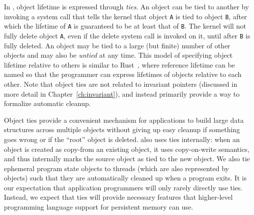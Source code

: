 In \Twizzler, object lifetime is expressed through \emph{ties}.
An object can be tied to another by invoking a system call that tells the kernel that
object \texttt{A} is tied to object \texttt{B}, after which the lifetime of \texttt{A} is
guaranteed to be at least that of \texttt{B}. The kernel will not fully delete object \texttt{A}, even if the
delete system call is invoked on it, until after \texttt{B} is fully deleted. An object may be tied
to a large (but finite) number of other objects and may also be \emph{untied} at any time. This
model of specifying object lifetime relative to others is similar to Rust~\cite{rust}, where
reference lifetime can be named so that the programmer can express lifetimes of objects relative to
each other. Note that object ties are not related to invariant pointers (discussed in more detail
in Chapter~\ref{ch:invariant}), and instead primarily provide a way to formalize automatic cleanup.


Object ties provide a convenient mechanism for applications to build large data structures across
multiple objects without giving up easy cleanup if something goes wrong or if the ``root'' object is
deleted. \Twizzler also uses ties internally: when an object is created as copy-from an existing
object, it uses copy-on-write semantics, and thus internally marks the source object as tied to the
new object. We also tie ephemeral program state objects to threads (which are also represented by
objects) such that they are automatically cleaned up when a program exits. It is our expectation
that application programmers will only rarely directly use ties. Instead, we expect that ties will
provide necessary features that higher-level programming language support for persistent memory can
use.

